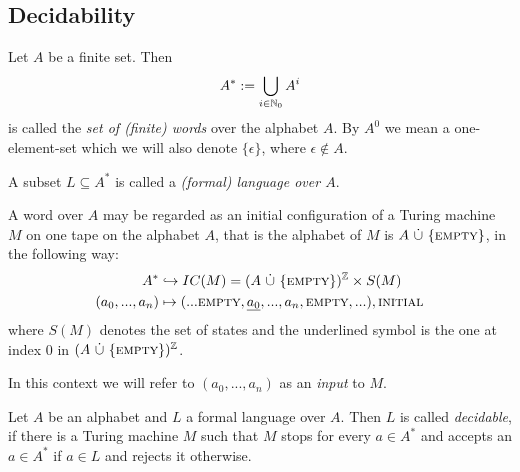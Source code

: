 \subsection{Decidability}

\begin{Definition}
	Let $A$ be a finite set. Then
	\begin{align*}
		A^* := \bigcup_{i \in \mathbb{N}_0} A^i
	\end{align*}
	is called the \emph{set of (finite) words} over the alphabet $A$.
	By $A^0$ we mean a one-element-set which we will also denote $\{\epsilon\}$, where $\epsilon \notin A$.

	A subset $L \subseteq A^*$ is called a \emph{(formal) language over $A$}.
\end{Definition}

A word over $A$ may be regarded as an initial configuration of a Turing machine $M$ on one tape on the alphabet $A$, that is the alphabet of $M$ is $A~\dot\cup~\{\text{\scshape{empty}}\}$, in the following way:
\begin{align*}
	A^* &\hookrightarrow IC(M) = (A~\dot\cup~\{\text{\scshape{empty}}\})^{\mathbb{Z}} \times S(M) \\
	(a_0, ... , a_n) &\mapsto (...\text{\scshape{empty}},\underline{a_0},...,a_n,\text{\scshape{empty}},...) , \text{\scshape{initial}} 
\end{align*}
where $S(M)$ denotes the set of states and the underlined symbol is the one at index $0$ in $(A~\dot\cup~\{\text{\scshape{empty}}\})^{\mathbb{Z}}$.

In this context we will refer to $(a_0,...,a_n)$ as an \emph{input} to $M$.

\begin{Definition}
	\label{halting_problem:decidability:definition_decidable}
	Let $A$ be an alphabet and $L$ a formal language over $A$. Then $L$ is called \emph{decidable}, if there is a Turing machine $M$ such that $M$ stops for every $a \in A^*$ and accepts an $a \in A^*$ if $a \in L$ and rejects it otherwise.
\end{Definition}

